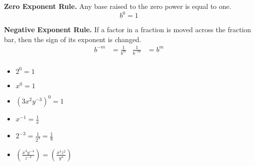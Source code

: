 \begin{tcbraster}[
    raster columns = 2,
    raster equal height,
    colback = white,
    raster before skip = 0in, raster after skip = 0in,
]
\begin{tcolorbox}[]
    {\bfseries Zero Exponent Rule.}
    Any base raised to the zero power is equal to one.
    \[b^0 = 1\]
\end{tcolorbox}
\begin{tcolorbox}[]
    {\bfseries Negative Exponent Rule.}
    If a factor in a fraction is moved across the fraction bar,
    then the sign of its exponent is changed.
    \begin{align*}
       b^{-m} &= \frac{1}{b^m}     &\frac{1}{b^{-m}}&=b^m \\
    \end{align*}
    \vspace{-1\onelineskip}
\end{tcolorbox}

\begin{tcolorbox}[enhanced,opacityframe=0,]
    \begin{itemize}
        \item $2^0 = 1$
        \item $x^0 = 1$
        \item $\left(3x^2 y^{-3}\right)^0 = 1$
    \end{itemize}
    \end{tcolorbox}
\begin{tcolorbox}[enhanced,opacityframe=0,]
    \begin{itemize}
        \item $x^{-1} = \frac{1}{x}$
        \item $2^{-3} = \frac{1}{2^3} = \frac{1}{8}$
        \item $
            \left(\frac{x^3y^{-4}}{z^{-2}}\right) 
            = 
            \left(\frac{x^3z^2}{y^4}\right) 
            $
    \end{itemize}
\end{tcolorbox}

\end{tcbraster}


